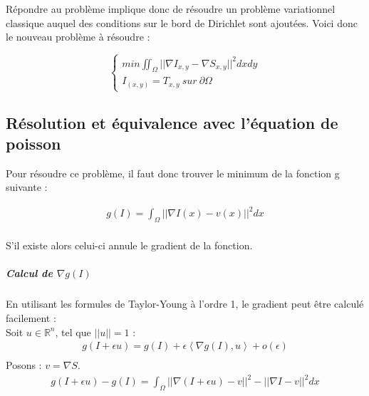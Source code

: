 Répondre au problème implique donc de résoudre un problème variationnel classique auquel des conditions sur le bord de Dirichlet sont ajoutées. 
Voici donc le nouveau problème à résoudre :   

\begin{center}
\begin{equation}
\left\{
\begin{aligned}
 min \iint_\Omega || \nabla I_{x,y} - \nabla S_{x,y}||^2 dxdy\\
 I_{(x,y)} = T_{x,y} \ sur\ \partial \Omega
\end{aligned}
\right.
\end{equation}
\end{center}


\subsection{Résolution et équivalence avec l'équation de poisson}
Pour résoudre ce problème, il faut donc trouver le minimum de la fonction g suivante  : 
\begin{center}
\begin{equation}
\begin{aligned}
g(I) = \int_\Omega || \nabla I(x) - v(x)||^2 dx\\
\end{aligned}
\end{equation}
\end{center}
S'il existe alors celui-ci annule le gradient de la fonction. 
\subparagraph{Calcul de $\nabla g(I)$ }
En utilisant les formules de Taylor-Young à l'ordre 1, le gradient peut être calculé facilement :\\
Soit $u \in \mathbb{R}^n$, tel que $||u||=1$ :
\begin{equation*}
\begin{aligned}
g(I+\epsilon u) = g(I) +\epsilon \left<\nabla g(I), u\right> + o(\epsilon)\\
\end{aligned}
\end{equation*}
Posons : $v = \nabla S$.
\begin{equation*} 
\begin{aligned}
    g(I+\epsilon u) -g(I) =  \int_\Omega || \nabla (I+\epsilon u) - v||^2 - ||\nabla I -v ||^2 dx\\
\end{aligned}
\end{equation*} 
